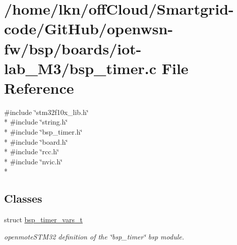 \hypertarget{iot-lab___m3_2bsp__timer_8c}{}\section{/home/lkn/off\+Cloud/\+Smartgrid-\/code/\+Git\+Hub/openwsn-\/fw/bsp/boards/iot-\/lab\+\_\+\+M3/bsp\+\_\+timer.c File Reference}
\label{iot-lab___m3_2bsp__timer_8c}
{\ttfamily \#include \char`\"{}stm32f10x\+\_\+lib.\+h\char`\"{}}\\*
{\ttfamily \#include \char`\"{}string.\+h\char`\"{}}\\*
{\ttfamily \#include \char`\"{}bsp\+\_\+timer.\+h\char`\"{}}\\*
{\ttfamily \#include \char`\"{}board.\+h\char`\"{}}\\*
{\ttfamily \#include \char`\"{}rcc.\+h\char`\"{}}\\*
{\ttfamily \#include \char`\"{}nvic.\+h\char`\"{}}\\*
\subsection*{Classes}
\begin{DoxyCompactItemize}
\item 
struct \hyperlink{structbsp__timer__vars__t}{bsp\+\_\+timer\+\_\+vars\+\_\+t}
\begin{DoxyCompactList}\small\item\em openmote\+S\+T\+M32 definition of the \char`\"{}bsp\+\_\+timer\char`\"{} bsp module. \end{DoxyCompactList}\end{DoxyCompactItemize}
